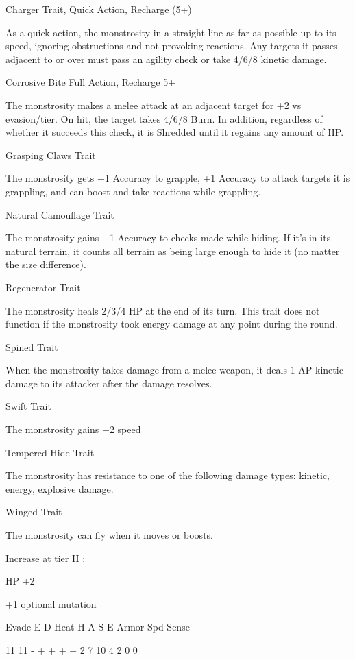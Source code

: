 Charger
Trait, Quick Action, Recharge (5+)

As a quick action, the monstrosity in a straight line as far as possible up to its speed, ignoring
obstructions and not provoking reactions. Any targets it passes adjacent to or over must pass an
agility check or take 4/6/8 kinetic damage.


Corrosive Bite
Full Action, Recharge 5+

The monstrosity makes a melee attack at an adjacent target for +2 vs evasion/tier. On hit, the
target takes 4/6/8 Burn. In addition, regardless of whether it succeeds this check, it is Shredded
until it regains any amount of HP.


Grasping Claws
Trait

The monstrosity gets +1 Accuracy to grapple, +1 Accuracy to attack targets it is grappling, and
can boost and take reactions while grappling.


Natural Camouflage
Trait

The monstrosity gains +1 Accuracy to checks made while hiding. If it's in its natural terrain, it
counts all terrain as being large enough to hide it (no matter the size difference).


Regenerator
Trait

The monstrosity heals 2/3/4 HP at the end of its turn. This trait does not function if the
monstrosity took energy damage at any point during the round.


Spined
Trait

When the monstrosity takes damage from a melee weapon, it deals 1 AP kinetic damage to its
attacker after the damage resolves.


Swift
Trait

The monstrosity gains +2 speed


Tempered Hide
Trait

The monstrosity has resistance to one of the following damage types: kinetic, energy, explosive
damage.





Winged
Trait

The monstrosity can fly when it moves or boosts.


Increase at tier II :

HP +2

+1 optional mutation


         Evade    E-D     Heat    H   A   S    E   Armor     Spd       Sense

         11       11      -       +   +   +    +   2         7         10
                                  4   2   0    0

